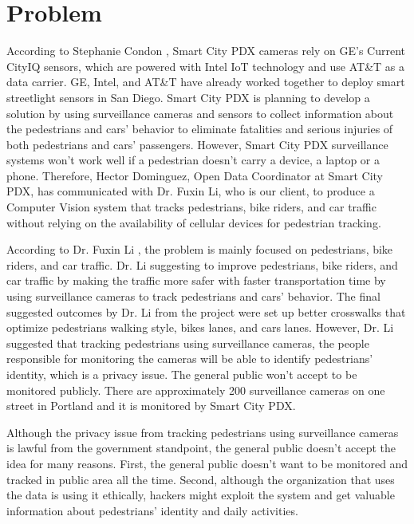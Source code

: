\documentclass[onecolumn, draftclsnofoot,10pt, compsoc]{IEEEtran}
\begin{document}
\section{Problem}
According to Stephanie Condon \cite{zd}, Smart City PDX cameras rely on GE's Current CityIQ sensors, which are powered with Intel IoT technology and use AT\&T as a data carrier. GE, Intel, and AT\&T have already worked together to deploy smart streetlight sensors in San Diego. Smart City PDX is planning to develop a solution by using surveillance cameras and sensors to collect information about the pedestrians and cars' behavior to eliminate fatalities and serious injuries of both pedestrians and cars' passengers. However, Smart City PDX surveillance systems won't work well if a pedestrian doesn't carry a device, a laptop or a phone. Therefore, Hector Dominguez, Open Data Coordinator at Smart City PDX, has communicated with Dr. Fuxin Li, who is our client, to produce a Computer Vision system that tracks pedestrians, bike riders, and car traffic without relying on the availability of cellular devices for pedestrian tracking.

According to Dr. Fuxin Li \cite{li}, the problem is mainly focused on pedestrians, bike riders, and car traffic. Dr. Li \cite{li} suggesting to improve pedestrians, bike riders, and car traffic by making the traffic more safer with faster transportation time by using surveillance cameras to track pedestrians and cars' behavior. The final suggested outcomes by Dr. Li \cite{li} from the project were set up better crosswalks that optimize pedestrians walking style, bikes lanes, and cars lanes. However, Dr. Li \cite{li} suggested that tracking pedestrians using surveillance cameras, the people responsible for monitoring the cameras will be able to identify pedestrians' identity, which is a privacy issue. The general public won't accept to be monitored publicly. There are approximately 200 surveillance cameras on one street in Portland and it is monitored by Smart City PDX.

Although the privacy issue from tracking pedestrians using surveillance cameras is lawful from the government standpoint, the general public doesn't accept the idea for many reasons. First, the general public doesn't want to be monitored and tracked in public area all the time. Second,  although the organization that uses the data is using it ethically, hackers might exploit the system and get valuable information about pedestrians' identity and daily activities.
\end{document}
